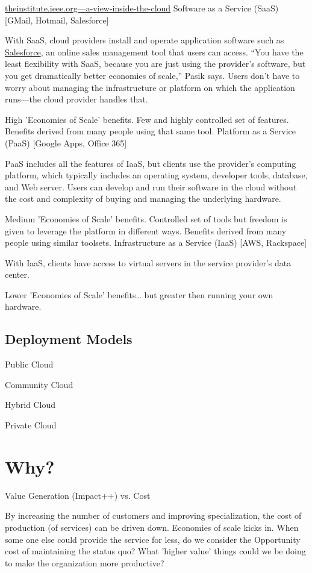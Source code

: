 \documentclass{article}
\begin{document}
\href{http://theinstitute.ieee.org/technology-focus/technology-topic/a-view-inside-the-cloud}{theinstitute.ieee.org—a-view-inside-the-cloud}
Software as a Service (SaaS) [GMail, Hotmail, Salesforce]

With SaaS, cloud providers install and operate application software such as 
\href{http://www.salesforce.com/}{Salesforce}, an online sales management tool that users can access.
“You have the least flexibility with SaaS, because you are just using the provider’s software, but you get dramatically better economies of scale,” Pasik says. Users don’t have to worry about managing the infrastructure or platform on which the application runs—the cloud provider handles that.

High 'Economies of Scale'  benefits.  Few and highly controlled set of features.  Benefits derived from many people using that same tool.
Platform as a Service (PaaS) [Google Apps, Office 365]

PaaS includes all the features of IaaS, but clients use the provider’s computing platform, which typically includes an operating system, developer tools, database, and Web server. Users can develop and run their software in the cloud without the cost and complexity of buying and managing the underlying hardware.

Medium 'Economies of Scale' benefits.  Controlled set of tools but freedom is given to leverage the platform in different ways.  Benefits derived from many people using similar toolsets.
Infrastructure as a Service (IaaS) [AWS, Rackspace]

With IaaS, clients have access to virtual servers in the service provider’s data center.

Lower 'Economies of Scale' benefits… but greater then running your own hardware.
\subsection{Deployment Models}
Public Cloud

Community Cloud

Hybrid Cloud

Private Cloud

\section{Why?}
Value Generation (Impact++) vs. Cost

By increasing the number of customers and improving specialization, the cost of production (of services) can be driven down. Economies of scale kicks in. When some one else could provide the service for less, do we consider the Opportunity cost of maintaining the status quo?  What 'higher value' things could we be doing to make the organization more productive?
\end{document}
